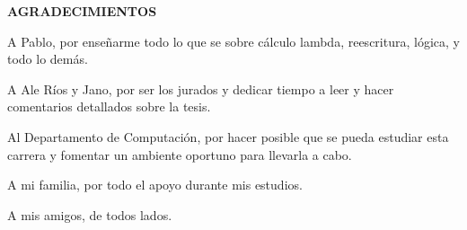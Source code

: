 \begin{center}
  \textbf{AGRADECIMIENTOS}
\end{center}

A Pablo, por enseñarme todo lo que se sobre cálculo lambda, reescritura, lógica, y todo lo demás.

A Ale Ríos y Jano, por ser los jurados y dedicar tiempo a leer y hacer comentarios detallados sobre la tesis.

Al Departamento de Computación, por hacer posible que se pueda estudiar esta carrera y fomentar un ambiente oportuno para llevarla a cabo.

A mi familia, por todo el apoyo durante mis estudios.

A mis amigos, de todos lados.
